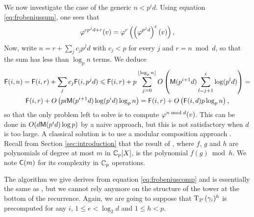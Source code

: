 We now investigate the case of the generic $n<p^id$. Using equation
\eqref{eq:frobeniussum}, one sees that
\begin{equation*}
  \varphi^{cp^jd + r}(v) = \varphi^r\left(\left(\varphi^{p^jd}\right)^c(v)\right)
  \text{,}
\end{equation*}
Now, write $n = r+\sum_jc_jp^jd$ with $c_j<p$ for every $j$ and
$r=n\bmod d$, so that the sum has less than $\log_pn$ terms. We deduce
\begin{multline*}
  \mathrm{\sf F}(i,n) = \mathrm{\sf F}(i,r) + \sum_jc_j\mathrm{\sf F}(i,p^jd) \leqslant
  \mathrm{\sf F}(i,r) +
  p\sum_{j=0}^{\lfloor\log_pn\rfloor} 
  O\left(\mathrm{\sf M}(p^{i+1}d)\sum_{l=j+1}^i\log(p^ld)\right)=\\
  \mathrm{\sf F}(i,r) + O\left(pi\mathrm{\sf M}(p^{i+1}d)\log(p^id)\log_pn\right) =
  \mathrm{\sf F}(i,r) + O\left(\mathrm{\sf F}(i,d)p\log_pn\right)
  \text{,}
\end{multline*}
so that the only problem left to solve is to compute $\varphi^{n\bmod
  d}(v)$. This can be done in $O(d\mathrm{\sf M}(p^id)\log p)$ by a naive
approach, but this is not satisfactory when $d$ is too large. A
classical solution is to use a modular composition approach
\cite{}. Recall from Section \ref{sec:introduction} that the result of
, where $f$, $g$ and $h$ are polynomials of
degree at most $m$ in $\mathbb{C}_p[X]$, is the polynomial $f(g)\bmod h$. We
note $\mathrm{\sf C}(m)$ for its complexity in $\mathbb{C}_p$ operations.

The algorithm we give derives from equation \eqref{eq:frobeniuscomp}
and is essentially the same as , but we
cannot rely anymore on the structure of the tower at the bottom of the
recurrence. Again, we are going to suppose that
$\operatorname{T}_{2^e}(\gamma_i)^h$ is precomputed for any $i$, $1\le e<\log_2d$
and $1\le h<p$.


